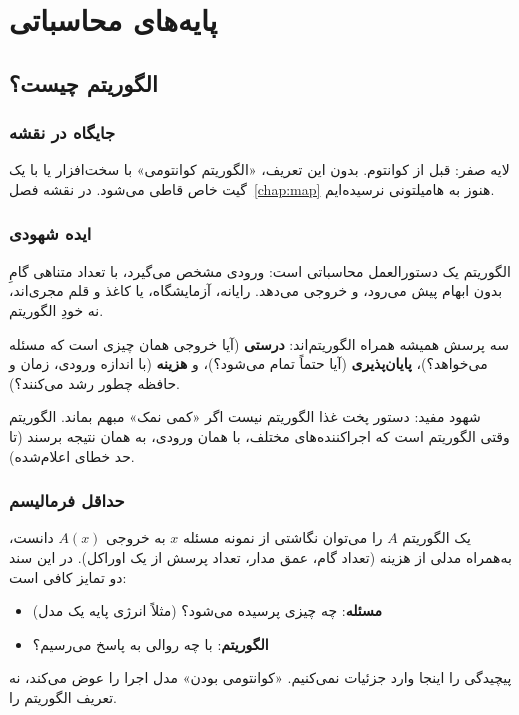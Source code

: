 \part{پایه‌های محاسباتی}

\chapter{الگوریتم چیست؟}
\label{chap:algorithm}

\section{جایگاه در نقشه}

لایه صفر: قبل از کوانتوم. بدون این تعریف، «الگوریتم کوانتومی» با سخت‌افزار یا با یک گیت خاص قاطی می‌شود. در نقشه فصل~\ref{chap:map} هنوز به هامیلتونی نرسیده‌ایم.

\section{ایده شهودی}

الگوریتم یک دستورالعمل محاسباتی است: ورودی مشخص می‌گیرد، با تعداد متناهی گامِ بدون ابهام پیش می‌رود، و خروجی می‌دهد. رایانه، آزمایشگاه، یا کاغذ و قلم مجری‌اند، نه خودِ الگوریتم.

سه پرسش همیشه همراه الگوریتم‌اند: \textbf{درستی} (آیا خروجی همان چیزی است که مسئله می‌خواهد؟)، \textbf{پایان‌پذیری} (آیا حتماً تمام می‌شود؟)، و \textbf{هزینه} (با اندازه ورودی، زمان و حافظه چطور رشد می‌کنند؟).

شهود مفید: دستور پخت غذا الگوریتم نیست اگر «کمی نمک» مبهم بماند. الگوریتم وقتی الگوریتم است که اجراکننده‌های مختلف، با همان ورودی، به همان نتیجه برسند (تا حد خطای اعلام‌شده).

\section{حداقل فرمالیسم}

یک الگوریتم $A$ را می‌توان نگاشتی از نمونه مسئله $x$ به خروجی $A(x)$ دانست، به‌همراه مدلی از هزینه (تعداد گام، عمق مدار، تعداد پرسش از یک اوراکل). در این سند دو تمایز کافی است:
\begin{itemize}
	\item \textbf{مسئله}: چه چیزی پرسیده می‌شود؟ (مثلاً انرژی پایه یک مدل)
	\item \textbf{الگوریتم}: با چه روالی به پاسخ می‌رسیم؟
\end{itemize}
پیچیدگی را اینجا وارد جزئیات نمی‌کنیم. «کوانتومی بودن» مدل اجرا را عوض می‌کند، نه تعریف الگوریتم را.

